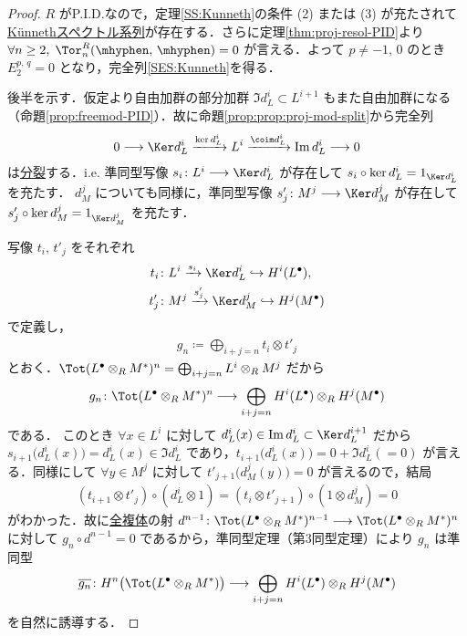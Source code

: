 \documentclass[algtopo_main]{subfiles}
\begin{document}
\begin{proof}
    $R$ がP.I.D.なので，定理\ref{SS:Kunneth}の条件 (2) または (3) が充たされて\hyperref[SS:Kunneth]{K\"unnethスペクトル系列}が存在する．さらに定理\ref{thm:proj-resol-PID}より $\forall n \ge 2,\; \Tor_n^R (\mhyphen,\, \mhyphen) = 0$ が言える．よって $p \neq -1,\, 0$ のとき $E_2^{p,\, q} = 0$ となり，完全列\eqref{SES:Kunneth}を得る．

    後半を示す．仮定より自由加群の部分加群 $\Im d_L^i \subset L^{i+1}$ もまた自由加群になる（命題\ref{prop:freemod-PID}）．故に命題\ref{prop:prop:proj-mod-split}から完全列
    \begin{align}
        0 \lto \Ker d_L^i \xrightarrow{\ker d_L^i} L^i \xrightarrow{\coim d_L^i} \Im d_L^i \lto 0
    \end{align}
    は\hyperref[def:split]{分裂}する．i.e. 準同型写像 $s_i \colon L^i \lto \Ker d_L^i$ が存在して $s_i \circ \ker d_L^i = 1_{\Ker d_L^i}$ を充たす．
    $d_M^j$ についても同様に，準同型写像 $s'_j \colon M^j \lto \Ker d_M^j$ が存在して $s'_j \circ \ker d_M^j = 1_{\Ker d_M^j}$ を充たす．

    写像 $t_i,\, t'_j$ をそれぞれ
    \begin{align}
        t_i &\colon L^i \xrightarrow{s_i} \Ker d_L^i \hookrightarrow H^i(L^\bullet), \\
        t'_j &\colon M^j \xrightarrow{s'_j} \Ker d_M^j \hookrightarrow H^j(M^\bullet)
    \end{align}
    で定義し，
    \begin{align}
        g_n \coloneqq \bigoplus_{i+j=n} t_i \otimes t'_j
    \end{align}
    とおく．$\Tot(L^\bullet \otimes_R M^*)^n = \bigoplus_{i+j=n} L^i \otimes_R M^j$ だから
    \begin{align}
        g_n \colon \Tot(L^\bullet \otimes_R M^*)^n \lto  \bigoplus_{i+j=n} H^i(L^\bullet) \otimes_R H^j(M^\bullet)
    \end{align}
    である．
    このとき $\forall x \in L^i$ に対して $d_L^i(x) \in \Im d_L^i \subset \Ker d_L^{i+1}$ だから $s_{i+1} \bigl( d_L^i(x) \bigr) = d_L^i (x) \in \Im d_L^i$ であり，$t_{i+1} \bigl( d_L^i(x) \bigr) = 0+\Im d_L^i (=0)$ が言える．同様にして $\forall y \in M^j$ に対して $t'_{j+1} \bigl( d_M^j(y) \bigr) = 0$ が言えるので，結局
    \begin{align}
        (t_{i+1} \otimes t'_j) \circ (d_L^i \otimes 1) = (t_{i} \otimes t'_{j+1}) \circ (1 \otimes d_M^j)  = 0
    \end{align}
    がわかった．故に\hyperref[def:Tot]{全複体}の射 $d^{n-1} \colon \Tot(L^\bullet \otimes_R M^*)^{n-1} \lto \Tot(L^\bullet \otimes_R M^*)^n$ に対して $g_n \circ d^{n-1} = 0$ であるから，準同型定理（第3同型定理）により $g_n$ は準同型
    \begin{align}
        \overline{g_n} \colon H^n \bigl( \Tot(L^\bullet \otimes_R M^*) \bigr) \lto  \bigoplus_{i+j=n} H^i(L^\bullet) \otimes_R H^j(M^\bullet)
    \end{align}
    を自然に誘導する．


\end{proof}
\end{document}
